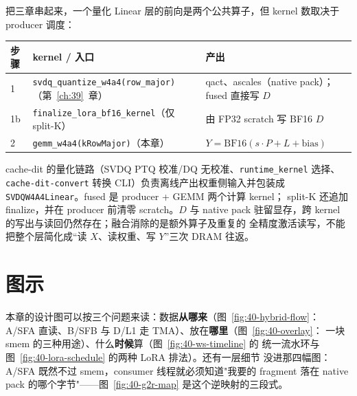 把三章串起来，一个量化 Linear 层的前向是两个公共算子，但 kernel 数取决于
producer 调度：

\begin{center}\small
\begin{tabular}{@{}lll@{}}
\toprule
步骤 & kernel / 入口 & 产出 \\
\midrule
1 & \texttt{svdq\_quantize\_w4a4(row\_major)}（第~\ref{ch:39}~章）
    & qact、ascales（native pack）；fused 直接写 $D$ \\
1b & \texttt{finalize\_lora\_bf16\_kernel}（仅 split-K） & 由 FP32 scratch 写 BF16 $D$ \\
2 & \texttt{gemm\_w4a4(kRowMajor)}（本章） & $Y=\mathrm{BF16}(s\cdot P+L+\mathrm{bias})$ \\
\bottomrule
\end{tabular}
\end{center}

cache-dit 的量化链路（SVDQ PTQ 校准/DQ 无校准、\texttt{runtime\_kernel}
选择、\texttt{cache-dit-convert} 转换 CLI）负责离线产出权重侧输入并包装成
\texttt{SVDQW4A4Linear}。fused 是 producer + GEMM 两个计算 kernel；
split-K 还追加 finalize，并在 producer 前清零 scratch。$D$ 与 native pack
驻留显存，跨 kernel 的写出与读回仍然存在；融合消除的是额外算子及重复的
全精度激活读写，不能把整个层简化成“读 $X$、读权重、写 $Y$”三次 DRAM
往返。

\section{图示}

本章的设计图可以按三个问题来读：数据\textbf{从哪来}（图~\ref{fig:40-hybrid-flow}：
A/SFA 直读、B/SFB 与 D/L1 走 TMA）、放在\textbf{哪里}（图~\ref{fig:40-overlay}：
一块 smem 的三种用途）、什么\textbf{时候}算（图~\ref{fig:40-ws-timeline} 的
统一流水环与图~\ref{fig:40-lora-schedule} 的两种 LoRA 排法）。还有一层细节
没进那四幅图：A/SFA 既然不过 smem，consumer 线程就必须知道"我要的 fragment
落在 native pack 的哪个字节"——图~\ref{fig:40-g2r-map} 是这个逆映射的三段式。


